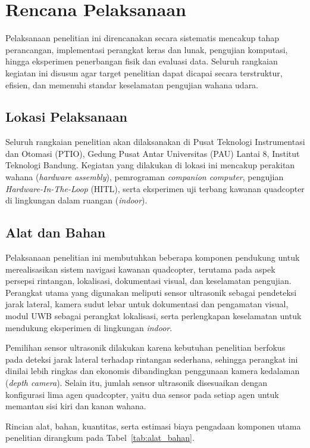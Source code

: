 \documentclass[12pt,a4paper]{report}
\numberwithin{equation}{chapter}
\begin{document}
\section{Rencana Pelaksanaan}
Pelaksanaan penelitian ini direncanakan secara sistematis mencakup tahap perancangan, implementasi perangkat keras dan lunak, pengujian komputasi, hingga eksperimen penerbangan fisik dan evaluasi data. Seluruh rangkaian kegiatan ini disusun agar target penelitian dapat dicapai secara terstruktur, efisien, dan memenuhi standar keselamatan pengujian wahana udara.

\subsection{Lokasi Pelaksanaan}
Seluruh rangkaian penelitian akan dilaksanakan di Pusat Teknologi Instrumentasi dan Otomasi (PTIO\label{abbr:ptio}), Gedung Pusat Antar Universitas (PAU) Lantai 8, Institut Teknologi Bandung. Kegiatan yang dilakukan di lokasi ini mencakup perakitan wahana (\textit{hardware assembly}), pemrograman \textit{companion computer}, pengujian \textit{Hardware-In-The-Loop} (HITL), serta eksperimen uji terbang kawanan quadcopter di lingkungan dalam ruangan (\textit{indoor}).

\subsection{Alat dan Bahan}
Pelaksanaan penelitian ini membutuhkan beberapa komponen pendukung untuk merealisasikan sistem navigasi kawanan quadcopter, terutama pada aspek persepsi rintangan, lokalisasi, dokumentasi visual, dan keselamatan pengujian. Perangkat utama yang digunakan meliputi sensor ultrasonik sebagai pendeteksi jarak lateral, kamera sudut lebar untuk dokumentasi dan pengamatan visual, modul UWB sebagai perangkat lokalisasi, serta perlengkapan keselamatan untuk mendukung eksperimen di lingkungan \textit{indoor}.

Pemilihan sensor ultrasonik dilakukan karena kebutuhan penelitian berfokus pada deteksi jarak lateral terhadap rintangan sederhana, sehingga perangkat ini dinilai lebih ringkas dan ekonomis dibandingkan penggunaan kamera kedalaman (\textit{depth camera}). Selain itu, jumlah sensor ultrasonik disesuaikan dengan konfigurasi lima agen quadcopter, yaitu dua sensor pada setiap agen untuk memantau sisi kiri dan kanan wahana.

Rincian alat, bahan, kuantitas, serta estimasi biaya pengadaan komponen utama penelitian dirangkum pada Tabel~\ref{tab:alat_bahan}.
\end{document}
